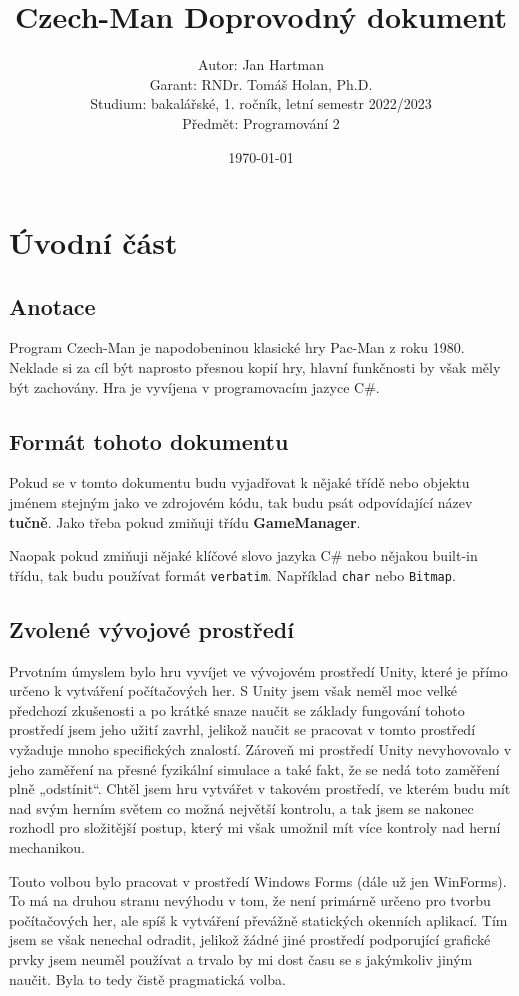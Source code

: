 \documentclass[a4]{article}
\title{Czech-Man
Doprovodný dokument}
\author{Autor: Jan Hartman
\\Garant: RNDr. Tomáš Holan, Ph.D.
\\Studium: bakalářské, 1. ročník, letní semestr 2022/2023
\\Předmět: Programování 2}
\date{\today}
\begin{document}
\maketitle
\tableofcontents
\pagestyle{fancy}
\newpage
\section{Úvodní část}
\subsection{Anotace}
Program Czech-Man je napodobeninou klasické hry Pac-Man z roku 1980. Neklade si za cíl být naprosto přesnou kopií hry, hlavní funkčnosti by však měly být zachovány. Hra je vyvíjena v programovacím jazyce C\#.
\subsection{Formát tohoto dokumentu}
Pokud se v tomto dokumentu budu vyjadřovat k nějaké třídě nebo objektu jménem stejným jako ve zdrojovém kódu, tak budu psát odpovídající název \textbf{tučně}. Jako třeba pokud zmiňuji třídu \textbf{GameManager}.

Naopak pokud zmiňuji nějaké klíčové slovo jazyka C\# nebo nějakou built-in třídu, tak budu používat formát \verb|verbatim|. Například \verb|char| nebo \verb|Bitmap|.
\subsection{Zvolené vývojové prostředí}
Prvotním úmyslem bylo hru vyvíjet ve vývojovém prostředí Unity, které je přímo určeno k vytváření počítačových her. S Unity jsem však neměl moc velké předchozí zkušenosti a po krátké snaze naučit se základy fungování tohoto prostředí jsem jeho užití zavrhl, jelikož naučit se pracovat v tomto prostředí vyžaduje mnoho specifických znalostí. Zároveň mi prostředí Unity nevyhovovalo v jeho zaměření na přesné fyzikální simulace a také fakt, že se nedá toto zaměření plně „odstínit“. Chtěl jsem hru vytvářet v takovém prostředí, ve kterém budu mít nad svým herním světem co možná největší kontrolu, a tak jsem se nakonec rozhodl pro složitější postup, který mi však umožnil mít více kontroly nad herní mechanikou.

Touto volbou bylo pracovat v prostředí Windows Forms (dále už jen WinForms). To má na druhou stranu nevýhodu v tom, že není primárně určeno pro tvorbu počítačových her, ale spíš k vytváření převážně statických okenních aplikací. Tím jsem se však nenechal odradit, jelikož žádné jiné prostředí podporující grafické prvky jsem neuměl používat a trvalo by mi dost času se s jakýmkoliv jiným naučit. Byla to tedy čistě pragmatická volba.
\newpage
\end{document}
